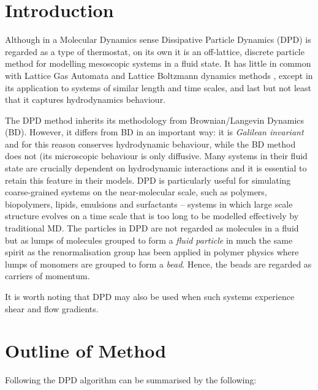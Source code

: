 \label{DPD-all}
\section{Introduction}

Although in a Molecular Dynamics sense Dissipative Particle Dynamics (DPD) is
regarded as a type of thermostat, on its own it is an off-lattice, discrete
particle method for modelling mesoscopic systems in a fluid state.  It has little
in common with Lattice Gas Automata and Lattice Boltzmann dynamics methods
\cite{hoogerbrugge-92a}, except in its application to systems of similar length
and time scales, and last but not least that it captures hydrodynamics behaviour.

The DPD method inherits its methodology from Brownian/Langevin Dynamics (BD).
However, it differs from BD in an important way: it is \emph{Galilean invariant}
and for this reason conserves hydrodynamic behaviour, while the BD method does not
(its microscopic behaviour is only diffusive.  Many systems in their fluid state
are crucially dependent on hydrodynamic interactions and it is essential to
retain this feature in their models.  DPD is particularly useful for simulating
coarse-grained systems on the near-molecular scale, such as polymers, biopolymers,
lipids, emulsions and surfactants -- systems in which large scale structure evolves
on a time scale that is too long to be modelled effectively by traditional MD.  The
particles in DPD \cite{espanol-95a} are not regarded as molecules in a fluid but as
lumps of molecules grouped to form a \emph{fluid particle} in much the same spirit
as the renormalisation group has been applied in polymer physics where lumps of monomers
are grouped to form a \emph{bead}.  Hence, the beads are regarded as carriers of momentum.

It is worth noting that DPD may also be used when such systems experience shear and flow gradients.

\section{Outline of Method}

Following \cite{groot-97a} the DPD algorithm can be summarised by the following:

